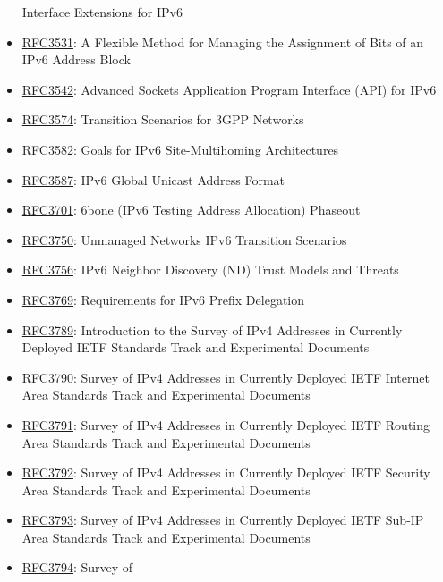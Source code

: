 \documentclass[
]{article}
\begin{document}
\begin{itemize}
  Interface Extensions for IPv6
\item
  \href{https://www.rfc-editor.org/info/rfc3531}{RFC3531}: A Flexible
  Method for Managing the Assignment of Bits of an IPv6 Address Block
\item
  \href{https://www.rfc-editor.org/info/rfc3542}{RFC3542}: Advanced
  Sockets Application Program Interface (API) for IPv6
\item
  \href{https://www.rfc-editor.org/info/rfc3574}{RFC3574}: Transition
  Scenarios for 3GPP Networks
\item
  \href{https://www.rfc-editor.org/info/rfc3582}{RFC3582}: Goals for
  IPv6 Site-Multihoming Architectures
\item
  \href{https://www.rfc-editor.org/info/rfc3587}{RFC3587}: IPv6 Global
  Unicast Address Format
\item
  \href{https://www.rfc-editor.org/info/rfc3701}{RFC3701}: 6bone (IPv6
  Testing Address Allocation) Phaseout
\item
  \href{https://www.rfc-editor.org/info/rfc3750}{RFC3750}: Unmanaged
  Networks IPv6 Transition Scenarios
\item
  \href{https://www.rfc-editor.org/info/rfc3756}{RFC3756}: IPv6 Neighbor
  Discovery (ND) Trust Models and Threats
\item
  \href{https://www.rfc-editor.org/info/rfc3769}{RFC3769}: Requirements
  for IPv6 Prefix Delegation
\item
  \href{https://www.rfc-editor.org/info/rfc3789}{RFC3789}: Introduction
  to the Survey of IPv4 Addresses in Currently Deployed IETF Standards
  Track and Experimental Documents
\item
  \href{https://www.rfc-editor.org/info/rfc3790}{RFC3790}: Survey of
  IPv4 Addresses in Currently Deployed IETF Internet Area Standards
  Track and Experimental Documents
\item
  \href{https://www.rfc-editor.org/info/rfc3791}{RFC3791}: Survey of
  IPv4 Addresses in Currently Deployed IETF Routing Area Standards Track
  and Experimental Documents
\item
  \href{https://www.rfc-editor.org/info/rfc3792}{RFC3792}: Survey of
  IPv4 Addresses in Currently Deployed IETF Security Area Standards
  Track and Experimental Documents
\item
  \href{https://www.rfc-editor.org/info/rfc3793}{RFC3793}: Survey of
  IPv4 Addresses in Currently Deployed IETF Sub-IP Area Standards Track
  and Experimental Documents
\item
  \href{https://www.rfc-editor.org/info/rfc3794}{RFC3794}: Survey of

\end{itemize}
\end{document}
